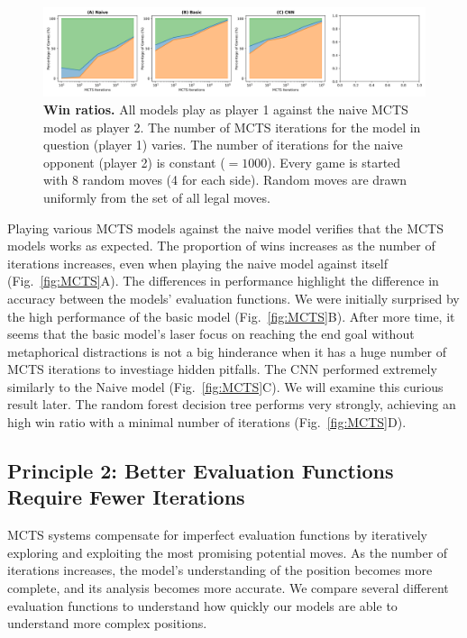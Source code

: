 \documentclass[10pt]{article}
\begin{document}
\begin{figure}[H]
    \centering
    \includegraphics[width=\linewidth]{win_rates.png}
    \caption{\textbf{Win ratios.} All models play as player 1 against the naive MCTS model as player 2. The number of MCTS iterations for the model in question (player 1) varies. The number of iterations for the naive opponent (player 2) is constant ($= 1000$). Every game is started with 8 random moves (4 for each side). Random moves are drawn uniformly from the set of all legal moves.}
    \label{fig:selfplay}
\end{figure}

Playing various MCTS models against the naive model verifies that the MCTS models works as expected. The proportion of wins increases as the number of iterations increases, even when playing the naive model against itself (Fig.~\ref{fig:MCTS}A). The differences in performance highlight the difference in accuracy between the models' evaluation functions. We were initially surprised by the high performance of the basic model (Fig.~\ref{fig:MCTS}B). After more time, it seems that the basic model's laser focus on reaching the end goal without metaphorical distractions is not a big hinderance when it has a huge number of MCTS iterations to investiage hidden pitfalls. The CNN performed extremely similarly to the Naive model (Fig.~\ref{fig:MCTS}C). We will examine this curious result later. The random forest decision tree performs very strongly, achieving an high win ratio with a minimal number of iterations (Fig.~\ref{fig:MCTS}D). 

\subsection{Principle 2: Better Evaluation Functions Require Fewer Iterations}

MCTS systems compensate for imperfect evaluation functions by iteratively exploring and exploiting the most promising potential moves. As the number of iterations increases, the model's understanding of the position becomes more complete, and its analysis becomes more accurate. We compare several different evaluation functions to understand how quickly our models are able to understand more complex positions.
\end{document}
